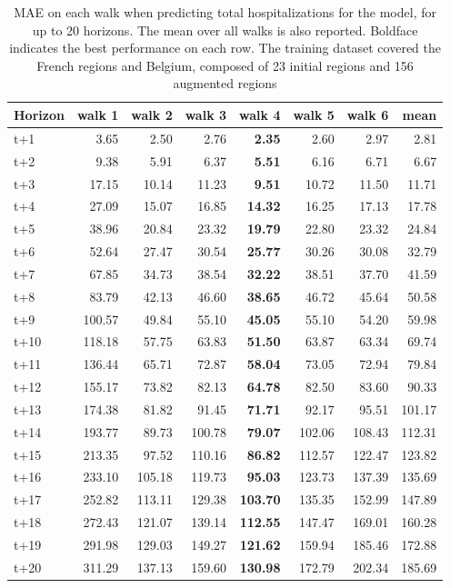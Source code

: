 \begin{table}[H]
\centering
\caption{MAE on each walk when predicting total hospitalizations for the model, for up to 20 horizons. The mean over all walks is also reported. Boldface indicates the best performance on each row. The training dataset covered the French regions and Belgium, composed of 23 initial regions and 156 augmented regions }
\label{tab:MAE_walk_custom_linear_regression}
\begin{tabular}{lrrrrrrr}
\toprule
Horizon &  walk 1 &  walk 2 &  walk 3 &  walk 4 &  walk 5 &  walk 6 &   mean \\
\midrule
t+1  & 3.65  & 2.50  & 2.76  & \textbf{2.35}  & 2.60  & 2.97  & 2.81  \\
t+2  & 9.38  & 5.91  & 6.37  & \textbf{5.51}  & 6.16  & 6.71  & 6.67  \\
t+3  & 17.15  & 10.14  & 11.23  & \textbf{9.51}  & 10.72  & 11.50  & 11.71  \\
t+4  & 27.09  & 15.07  & 16.85  & \textbf{14.32}  & 16.25  & 17.13  & 17.78  \\
t+5  & 38.96  & 20.84  & 23.32  & \textbf{19.79}  & 22.80  & 23.32  & 24.84  \\
t+6  & 52.64  & 27.47  & 30.54  & \textbf{25.77}  & 30.26  & 30.08  & 32.79  \\
t+7  & 67.85  & 34.73  & 38.54  & \textbf{32.22}  & 38.51  & 37.70  & 41.59  \\
t+8  & 83.79  & 42.13  & 46.60  & \textbf{38.65}  & 46.72  & 45.64  & 50.58  \\
t+9  & 100.57  & 49.84  & 55.10  & \textbf{45.05}  & 55.10  & 54.20  & 59.98  \\
t+10  & 118.18  & 57.75  & 63.83  & \textbf{51.50}  & 63.87  & 63.34  & 69.74  \\
t+11  & 136.44  & 65.71  & 72.87  & \textbf{58.04}  & 73.05  & 72.94  & 79.84  \\
t+12  & 155.17  & 73.82  & 82.13  & \textbf{64.78}  & 82.50  & 83.60  & 90.33  \\
t+13  & 174.38  & 81.82  & 91.45  & \textbf{71.71}  & 92.17  & 95.51  & 101.17  \\
t+14  & 193.77  & 89.73  & 100.78  & \textbf{79.07}  & 102.06  & 108.43  & 112.31  \\
t+15  & 213.35  & 97.52  & 110.16  & \textbf{86.82}  & 112.57  & 122.47  & 123.82  \\
t+16  & 233.10  & 105.18  & 119.73  & \textbf{95.03}  & 123.73  & 137.39  & 135.69  \\
t+17  & 252.82  & 113.11  & 129.38  & \textbf{103.70}  & 135.35  & 152.99  & 147.89  \\
t+18  & 272.43  & 121.07  & 139.14  & \textbf{112.55}  & 147.47  & 169.01  & 160.28  \\
t+19  & 291.98  & 129.03  & 149.27  & \textbf{121.62}  & 159.94  & 185.46  & 172.88  \\
t+20  & 311.29  & 137.13  & 159.60  & \textbf{130.98}  & 172.79  & 202.34  & 185.69  \\

\bottomrule
\end{tabular}
\end{table}
